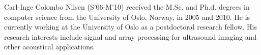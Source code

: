 
\begin{IEEEbiography}{Carl-Inge Colombo Nilsen}
(S'06-M'10) received the M.Sc. and Ph.d. degrees in computer science from the University of Oslo, Norway, in 2005 and 2010. He is currently working at the University of Oslo as a postdoctoral research fellow. His research interests include signal and array processing for ultrasound imaging and other acoustical applications.
\end{IEEEbiography}